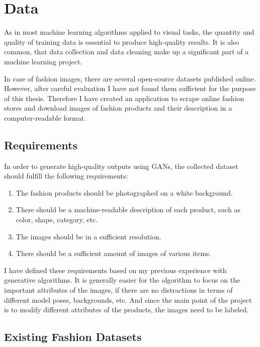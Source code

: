 \documentclass[12pt]{report}
\begin{document}
\section{Data} \label{sec:data}
As in most machine learning algorithms applied to visual tasks, the quantity and quality of training data is essential to produce high-quality results. It is also common, that data collection and data cleaning make up a significant part of a machine learning project.

In case of fashion images, there are several open-source datasets published online. However, after careful evaluation I have not found them sufficient for the purpose of this thesis. Therefore I have created an application to scrape online fashion stores and download images of fashion products and their description in a computer-readable format.

\pagebreak
\subsection{Requirements}

In order to generate high-quality outputs using GANs, the collected dataset should fulfill the following requirements:
\begin{enumerate}
\item The fashion products should be photographed on a white background. 
\item There should be a machine-readable description of each product, such as color, shape, category, etc. 
\item The images should be in a sufficient resolution.
\item There should be a sufficient amount of images of various items.

\end{enumerate}
I have defined these requirements based on my previous experience with generative algorithms. It is generally easier for the algorithm to focus on the important attributes of the images, if there are no distractions in terms of different model poses, backgrounds, etc. And since the main point of the project is to modify different attributes of the products, the images need to be labeled.

\subsection{Existing Fashion Datasets}
\end{document}
